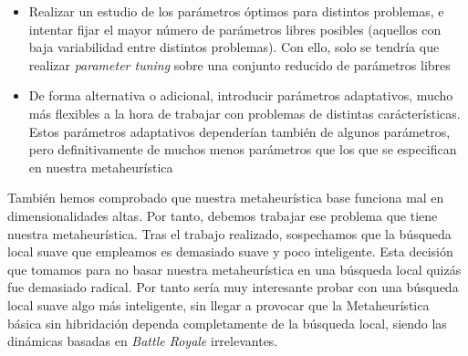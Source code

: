 \documentclass[11pt]{article}
\begin{document}
\begin{itemize}
    \item Realizar un estudio de los parámetros óptimos para distintos problemas, e intentar fijar el mayor número de parámetros libres posibles (aquellos con baja variabilidad entre distintos problemas). Con ello, solo se tendría que realizar \emph{parameter tuning} sobre una conjunto reducido de parámetros libres
    \item De forma alternativa o adicional, introducir parámetros adaptativos, mucho más flexibles a la hora de trabajar con problemas de distintas carácterísticas. Estos parámetros adaptativos dependerían también de algunos parámetros, pero definitivamente de muchos menos parámetros que los que se especifican en nuestra metaheurística
\end{itemize}

También hemos comprobado que nuestra metaheurística base funciona mal en dimensionalidades altas. Por tanto, debemos trabajar ese problema que tiene nuestra metaheurística. Tras el trabajo realizado, sospechamos que la búsqueda local suave que empleamos es demasiado suave y poco inteligente. Esta decisión que tomamos para no basar nuestra metaheurística en una búsqueda local quizás fue demasiado radical. Por tanto sería muy interesante probar con una búsqueda local suave algo más inteligente, sin llegar a provocar que la Metaheurística básica sin hibridación dependa completamente de la búsqueda local, siendo las dinámicas basadas en \emph{Battle Royale} irrelevantes.

\pagebreak



\end{document}
